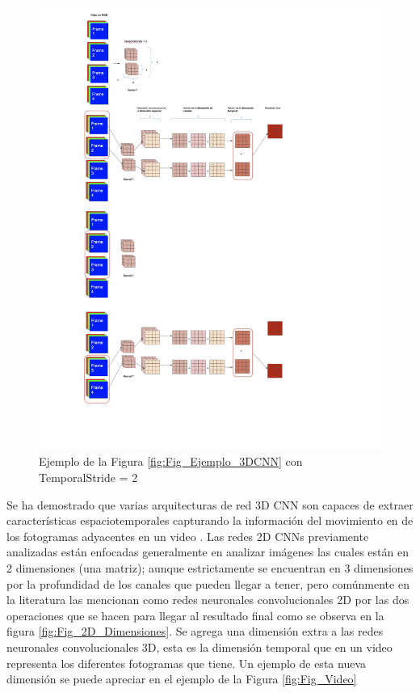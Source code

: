 \begin{onehalfspacing}
\begin{figure}[p]
	\centering
	\includegraphics[width=19cm,keepaspectratio]{XX_Figures/Fig_3DCNN_TemporalStride.png}
	\caption{\footnotesize Ejemplo de la Figura \ref{fig:Fig_Ejemplo_3DCNN} con TemporalStride = 2}
	\label{fig:Fig_3DCNN_TemporalStride}
\end{figure}

Se ha demostrado que varias arquitecturas de red 3D CNN son capaces de extraer características espaciotemporales capturando la información del movimiento en de los fotogramas adyacentes en un video \cite{Ji20133DRecognition}. Las redes 2D CNNs previamente analizadas están enfocadas generalmente en analizar imágenes las cuales están en 2 dimensiones (una matriz); aunque estrictamente se encuentran en 3 dimensiones por la profundidad de los canales que pueden llegar a tener, pero comúnmente en la literatura las mencionan como redes neuronales convolucionales 2D por las dos operaciones que se hacen para llegar al resultado final como se observa en la figura \ref{fig:Fig_2D_Dimensiones}. Se agrega una dimensión extra a las redes neuronales convolucionales 3D, esta es la dimensión temporal que en un video representa los diferentes fotogramas que tiene. Un ejemplo de esta nueva dimensión se puede apreciar en el ejemplo de la Figura \ref{fig:Fig_Video}\\



\end{onehalfspacing}
